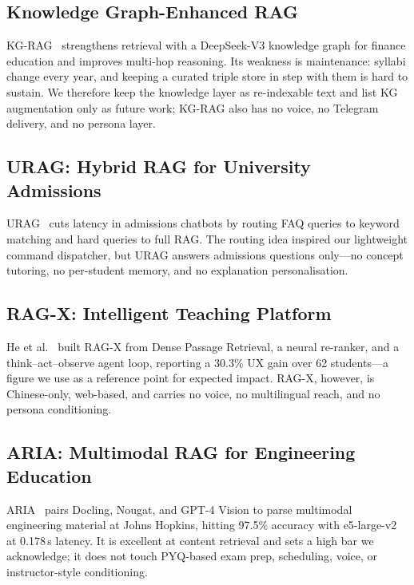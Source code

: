 \documentclass[conference]{IEEEtran}
\begin{document}
\subsection{Knowledge Graph-Enhanced RAG}
KG-RAG~\cite{dong2025} strengthens retrieval with a DeepSeek-V3
knowledge graph for finance education and improves multi-hop reasoning.
Its weakness is maintenance: syllabi change every year, and keeping a
curated triple store in step with them is hard to sustain. We therefore
keep the knowledge layer as re-indexable text and list KG augmentation
only as future work; KG-RAG also has no voice, no Telegram delivery,
and no persona layer.

\subsection{URAG: Hybrid RAG for University Admissions}
URAG~\cite{nguyen2025} cuts latency in admissions chatbots by routing
FAQ queries to keyword matching and hard queries to full RAG. The
routing idea inspired our lightweight command dispatcher, but URAG
answers admissions questions only---no concept tutoring, no per-student
memory, and no explanation personalisation.

\subsection{RAG-X: Intelligent Teaching Platform}
He et al.~\cite{he2025} built RAG-X from Dense Passage Retrieval, a
neural re-ranker, and a think--act--observe agent loop, reporting a
30.3\% UX gain over 62 students---a figure we use as a reference point
for expected impact. RAG-X, however, is Chinese-only, web-based, and
carries no voice, no multilingual reach, and no persona conditioning.

\subsection{ARIA: Multimodal RAG for Engineering Education}
ARIA~\cite{luo2026} pairs Docling, Nougat, and GPT-4 Vision to parse
multimodal engineering material at Johns Hopkins, hitting 97.5\%
accuracy with e5-large-v2 at 0.178\,s latency. It is excellent at
content retrieval and sets a high bar we acknowledge; it does not touch
PYQ-based exam prep, scheduling, voice, or instructor-style conditioning.
\end{document}
